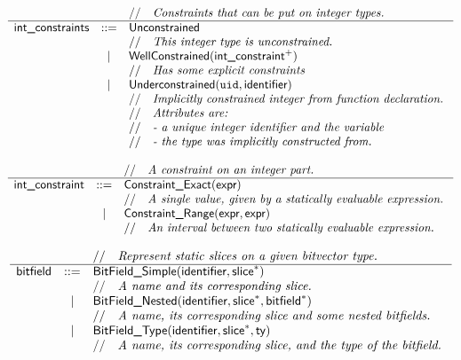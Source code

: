 \documentclass{book}
\begin{document}
\[
  \begin{array}{rcl}
    & & //\quad\textit{Constraints that can be put on integer types.}\   \\
    \hline
    \textsf{int\_constraints} & ::=
      & \textsf{Unconstrained}                                      \\
    & & //\quad\textit{This integer type is unconstrained.}\             \\
    &|& \textsf{WellConstrained}(\textsf{int\_constraint}^{+})                \\
    & & //\quad\textit{Has some explicit constraints}\                   \\
    &|& \textsf{Underconstrained}(\texttt{uid}, \textsf{identifier})        \\
    & & //\quad\textit{Implicitly constrained integer from function declaration.}\  \\
    & & //\quad\textit{Attributes are:}\  \\
    & & //\quad\textit{- a unique integer identifier and the variable}\  \\
    & & //\quad\textit{- the type was implicitly constructed from.}\  \\
  \end{array}
\]

\[
\begin{array}{rcl}
& & //\quad\textit{A constraint on an integer part.}\ \\
\hline
\textsf{int\_constraint} &::=& \textsf{Constraint\_Exact}(\textsf{expr}) \\
  & & //\quad\textit{A single value, given by a statically evaluable expression.}\ \\
  &|& \textsf{Constraint\_Range}(\textsf{expr}, \textsf{expr}) \\
  & & //\quad\textit{An interval between two statically evaluable expression.}\ \\
\end{array}
\]

\[
\begin{array}{rcl}
& & //\quad\textit{Represent static slices on a given bitvector type.}\ \\
\hline
\textsf{bitfield} &::=& \textsf{BitField\_Simple}(\textsf{identifier}, \textsf{slice}^{*}) \\
  & & //\quad\textit{A name and its corresponding slice.}\ \\
  &|& \textsf{BitField\_Nested}(\textsf{identifier}, \textsf{slice}^{*}, \textsf{bitfield}^{*}) \\
  & & //\quad\textit{A name, its corresponding slice and some nested bitfields.}\ \\
  &|& \textsf{BitField\_Type}(\textsf{identifier}, \textsf{slice}^{*}, \textsf{ty}) \\
  & & //\quad\textit{A name, its corresponding slice, and the type of the bitfield.}\ \\
\end{array}
\]
\end{document}
